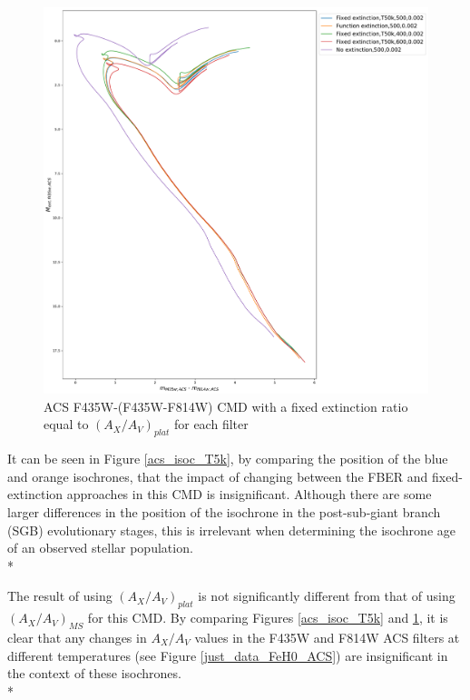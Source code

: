 \documentclass[12pt, a4paper]{report}
\begin{document}
\begin{figure}[h]
\begin{center}
\includegraphics[width=1.0\textwidth]{../basti_isochrones_10_13Gyr/Extinction_T50k_FeH0fix_func_f435wACS_f435wACSmf814wACS_500_400_600_Myr_FeH_0p002_ref_noext_Av_1p0.pdf}
\caption{ACS F435W-(F435W-F814W) CMD with a fixed extinction ratio equal to $(A_{X}/A_{V})_{plat}$ for each filter}
\label{acs_isoc_T50k}
\end{center}
\end{figure}

It can be seen in Figure \ref{acs_isoc_T5k}, by comparing the position of the blue and orange isochrones, that the impact of changing between the FBER and fixed-extinction approaches in this CMD is insignificant. Although there are some larger differences in the position of the isochrone in the post-sub-giant branch (SGB) evolutionary stages, this is irrelevant when determining the isochrone age of an observed stellar population.\\*

The result of using $(A_{X}/A_{V})_{plat}$ is not significantly different from that of using $(A_{X}/A_{V})_{MS}$ for this CMD. By comparing Figures \ref{acs_isoc_T5k} and \ref{acs_isoc_T50k}, it is clear that any changes in $A_{X}/A_{V}$ values in the F435W and F814W ACS filters at different temperatures (see Figure \ref{just_data_FeH0_ACS}) are insignificant in the context of these isochrones.\\*
\end{document}
